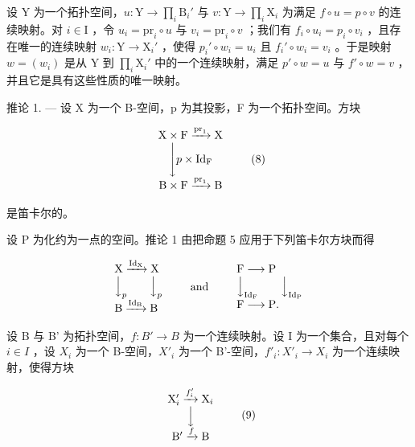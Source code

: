 设 Y 为一个拓扑空间，\(u \colon \mathrm{Y} \to \prod_{i} \mathrm{B}_{i}'\) 与 \(v \colon \mathrm{Y} \to \prod_{i} \mathrm{X}_{i}\) 为满足 \(f \circ u = p \circ v\) 的连续映射。对 \(i \in \mathrm{I}\) ，令 \(u_{i} = \mathrm{pr}_{i} \circ u\) 与 \(v_{i} = \mathrm{pr}_{i} \circ v\) ；我们有 \(f_{i} \circ u_{i} = p_{i} \circ v_{i}\) ，且存在唯一的连续映射 \(w_{i} \colon \mathrm{Y} \to \mathrm{X}_{i}'\) ，使得 \(p_{i}' \circ w_{i} = u_{i}\) 且 \(f_{i}' \circ w_{i} = v_{i}\) 。于是映射 \(w = (w_{i})\) 是从 Y 到 \(\prod_{i} \mathrm{X}_{i}'\) 中的一个连续映射，满足 \(p' \circ w = u\) 与 \(f' \circ w = v\) ，并且它是具有这些性质的唯一映射。

推论 1. --- 设 X 为一个 B-空间，p 为其投影，F 为一个拓扑空间。方块

\[
\begin{array}{c} \mathrm{X} \times \mathrm{F} \xrightarrow {\operatorname{pr} _ {1}} \mathrm{X} \\ \Biggl \downarrow p \times \mathrm{Id} _ {\mathrm{F}} \\ \mathrm{B} \times \mathrm{F} \xrightarrow {\operatorname{pr} _ {1}} \mathrm{B} \end{array}\tag{8}
\]

是笛卡尔的。

设 P 为化约为一点的空间。推论 1 由把命题 5 应用于下列笛卡尔方块而得

\[
\begin{array}{l} \mathrm{X} \xrightarrow {\mathrm{Id} _ {\mathrm{X}}} \mathrm{X} \\ \Big \downarrow_ {p} \qquad \Big \downarrow_ {p} \\ \mathrm{B} \xrightarrow {\mathrm{Id} _ {\mathrm{B}}} \mathrm{B} \end{array} \qquad \text {and} \qquad \begin{array}{l} \mathrm{F} \longrightarrow \mathrm{P} \\ \Big \downarrow_ {\mathrm{Id} _ {\mathrm{F}}} \qquad \Big \downarrow_ {\mathrm{Id} _ {\mathrm{P}}} \\ \mathrm{F} \longrightarrow \mathrm{P}. \end{array}
\]

设 B 与 B' 为拓扑空间，\(f: B' \to B\) 为一个连续映射。设 I 为一个集合，且对每个 \(i \in I\) ，设 \(X_i\) 为一个 B-空间，\(X'_i\) 为一个 B'-空间，\(f'_i: X'_i \to X_i\) 为一个连续映射，使得方块

\[
\begin{array}{c} \mathrm{X} _ {i} ^ {\prime} \xrightarrow {f _ {i} ^ {\prime}} \mathrm{X} _ {i} \\ \Big \downarrow \\ \mathrm{B} ^ {\prime} \xrightarrow {f} \mathrm{B} \end{array}\tag{9}
\]

